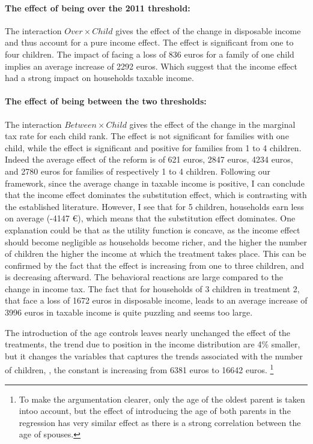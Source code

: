  
 \paragraph{The effect of being over the 2011 threshold:}

 The interaction $Over \times Child $ gives the effect of the change in disposable income and thus account for a pure income effect. The effect is significant from one to four children. The impact of facing a loss of 836 euros for a family of one child implies an average increase of 2292 euros. Which suggest that the income effect had a strong impact on households taxable income.



 \paragraph{The effect of being between the two thresholds:}


 The interaction $Between \times Child $ gives the effect of the change in the marginal tax rate for each child rank. The effect is not significant for families with one child, while the effect is significant and positive for families from 1 to 4 children. Indeed the average effect of the reform is of 621 euros, 2847 euros, 4234 euros, and 2780 euros for families of respectively 1 to 4 children. Following our framework, since the average change in taxable income is positive, I can conclude that the income effect dominates the substitution effect, which is contrasting with the established literature. However, I see that for 5 children, households earn less on average (-4147 \euro{}), which means that the substitution effect dominates. One explanation could be that as the utility function is concave, as the income effect should become negligible as households become richer, and the higher the number of children the higher the income at which the treatment takes place. This can be confirmed by the fact that the effect is increasing from one to three children, and is decreasing afterward.
 The behavioral reactions are large compared to the change in income tax. The fact that for households of 3 children in treatment 2, that face a loss of 1672 euros in disposable income, leads to an average increase of 3996 euros in taxable income is quite puzzling and seems too large. 
\medskip

The introduction of the age controls leaves nearly unchanged the effect of the treatments, the trend due to position in the income distribution are 4\% smaller, but it changes the variables that captures the trends associated with the number of children, , the constant is increasing from 6381 euros to 16642 euros. \footnote{To make the argumentation clearer, only the age of the oldest parent is taken intoo account, but the effect of introducing the age of both parents in the regression has very similar effect as there is a strong correlation between the age of spouses.}


